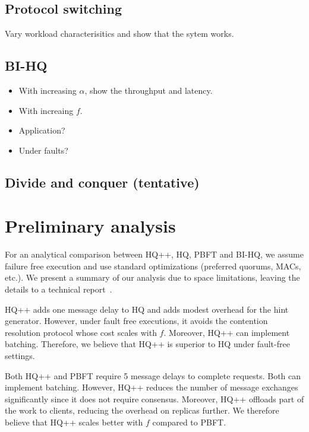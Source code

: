 \documentclass[twocolumn,10pt]{article}
\begin{document}
\subsection{Protocol switching}

Vary workload characterisitics and show that the sytem works. 

\subsection{BI-HQ}
\begin{itemize}
\item{} With increasing $\alpha$, show the throughput and latency. 
\item{} With increaing $f$. 
\item{} Application? 
\item{} Under faults? 
\end{itemize}

\subsection{Divide and conquer (tentative)}

\section{Preliminary analysis}
\label{sec:analysis}
For an analytical comparison between HQ++, HQ, PBFT and BI-HQ, we assume failure free execution 
and use standard optimizations (preferred quorums, MACs, etc.). We present a summary of our
analysis due to space limitations, leaving the details to a technical report~\cite{hq++:website}. 

 HQ++ adds one message delay to HQ and adds modest overhead for the
hint generator. However, under fault free executions, it avoids the contention 
resolution protocol whose
cost scales with $f$. Moreover, HQ++ can implement batching. 
Therefore, we believe that HQ++ is superior to HQ under fault-free settings.

 Both HQ++ and PBFT require 5 message delays to complete requests.
Both can implement batching. However, HQ++ reduces the number of message exchanges significantly
since it does not require consensus. Moreover, HQ++ offloads part of the work to clients, reducing
the overhead on replicas further. We therefore believe that HQ++ scales better with $f$ compared to
PBFT.
\end{document}
